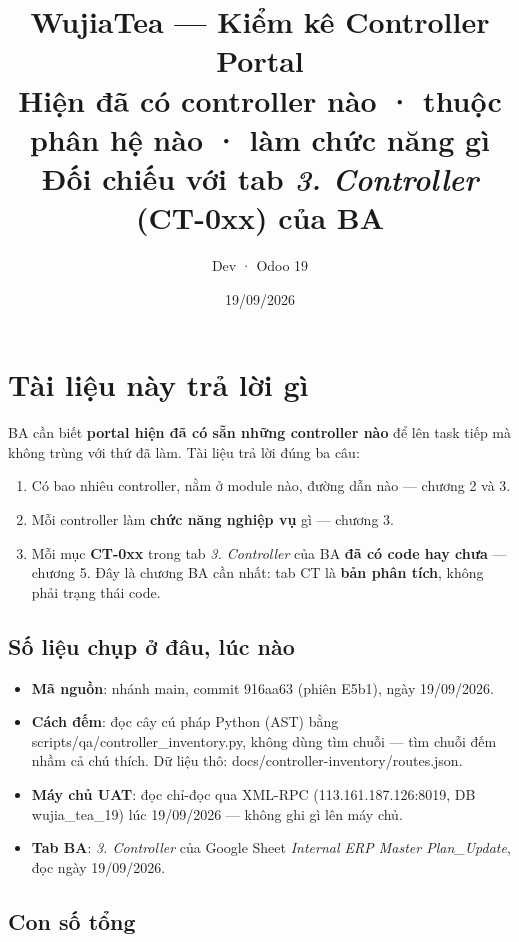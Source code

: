 \documentclass[11pt,a4paper]{report}
\title{\textbf{WujiaTea — Kiểm kê Controller Portal}\\[4pt]
\large Hiện đã có controller nào · thuộc phân hệ nào · làm chức năng gì\\[2pt]
\large Đối chiếu với tab \textit{3. Controller} (CT-0xx) của BA}
\author{Dev · Odoo 19}
\date{19/09/2026}
\newcommand{\rt}[1]{{\ttfamily\footnotesize #1}}
\begin{document}
\maketitle
\tableofcontents

\chapter{Tài liệu này trả lời gì}

BA cần biết \textbf{portal hiện đã có sẵn những controller nào} để lên task tiếp mà không
trùng với thứ đã làm. Tài liệu trả lời đúng ba câu:

\begin{enumerate}[leftmargin=*]
  \item Có bao nhiêu controller, nằm ở module nào, đường dẫn nào — chương 2 và 3.
  \item Mỗi controller làm \textbf{chức năng nghiệp vụ} gì — chương 3.
  \item Mỗi mục \textbf{CT-0xx} trong tab \textit{3. Controller} của BA \textbf{đã có code hay
        chưa} — chương 5. Đây là chương BA cần nhất: tab CT là \textbf{bản phân tích},
        không phải trạng thái code.
\end{enumerate}

\section{Số liệu chụp ở đâu, lúc nào}

\begin{itemize}[leftmargin=*]
  \item \textbf{Mã nguồn}: nhánh \rt{main}, commit \rt{916aa63} (phiên E5b1), ngày 19/09/2026.
  \item \textbf{Cách đếm}: đọc cây cú pháp Python (AST) bằng
        \rt{scripts/qa/controller\_inventory.py}, không dùng tìm chuỗi — tìm chuỗi đếm nhầm cả
        chú thích. Dữ liệu thô: \rt{docs/controller-inventory/routes.json}.
  \item \textbf{Máy chủ UAT}: đọc chỉ-đọc qua XML-RPC (\rt{113.161.187.126:8019}, DB
        \rt{wujia\_tea\_19}) lúc 19/09/2026 — không ghi gì lên máy chủ.
  \item \textbf{Tab BA}: \textit{3. Controller} của Google Sheet \textit{Internal ERP Master
        Plan\_Update}, đọc ngày 19/09/2026.
\end{itemize}

\section{Con số tổng}
\end{document}

